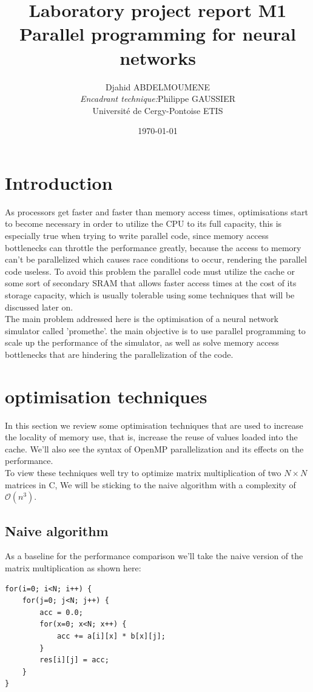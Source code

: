 \documentclass {article}
\title{Laboratory project report M1\\
Parallel programming for neural networks}
\date{\today}
\author{Djahid ABDELMOUMENE\\
\textit{Encadrant technique:}Philippe GAUSSIER\\
Université de Cergy-Pontoise   ETIS}
\begin{document}
\maketitle
\newpage
\tableofcontents
\newpage
\section{Introduction}
As processors get faster and faster than memory access times, optimisations
start to become necessary in order to utilize the CPU to its full capacity,
this is especially true when trying to write parallel code, since memory access
bottlenecks can throttle the performance greatly, because the access to memory
can't be parallelized which causes race conditions to occur, rendering the
parallel code useless. To avoid this problem the parallel code must utilize the
cache or some sort of secondary SRAM that allows faster access times at the
cost of its storage capacity, which is usually tolerable using some techniques
that will be discussed later on.\\

The main problem addressed here is the optimisation of a neural network simulator
called 'promethe'. the main objective is to use parallel programming to scale up
the performance of the simulator, as well as solve memory access bottlenecks that
are hindering the parallelization of the code.

\section{optimisation techniques}
In this section we review some optimisation techniques that are used to
increase the locality of memory use, that is, increase the reuse of values
loaded into the cache. We'll also see the syntax of OpenMP parallelization and
its effects on the performance.\\

To view these techniques well try to optimize matrix multiplication of two
$N\times N$ matrices in C, We will be sticking to the naive algorithm with
a complexity of $\mathcal{O}(n^3)$.


\subsection{Naive algorithm}
As a baseline for the performance comparison we'll take the naive version of
the matrix multiplication as shown here:

\begin{lstlisting}
for(i=0; i<N; i++) {
    for(j=0; j<N; j++) { 
        acc = 0.0;
        for(x=0; x<N; x++) {
            acc += a[i][x] * b[x][j];
        }
        res[i][j] = acc;
    }
}
\end{lstlisting}
\end{document}
